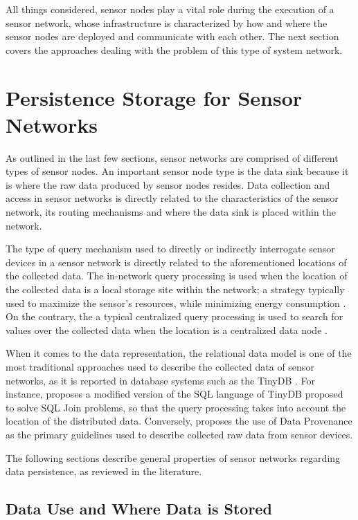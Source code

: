 All things considered, sensor nodes play a vital role during the execution
of a sensor network, whose infrastructure is characterized by how and where the
sensor nodes are deployed and communicate with each other. The next
section covers the approaches dealing with the problem of this type of system
network.

\section{Persistence Storage for Sensor Networks}

As outlined in the last few sections, sensor networks are comprised of
different types of sensor nodes. An important sensor node type is the
data sink because it is where the raw data produced by sensor
nodes resides. Data collection and access in sensor networks is directly
related to the characteristics of the sensor network, its routing mechanisms
and where the data sink is placed within the network.

The type of query mechanism used to directly or indirectly interrogate sensor
devices in a sensor network is directly related to the aforementioned locations
of the collected data. The in-network query processing is used when the
location of the collected data is a local storage site \cite{sn-storage01,
sn-storage03} within the network; a strategy typically used to maximize the
sensor's resources, while minimizing energy consumption \cite{sn-storage04}. On
the contrary, the a typical centralized query processing is used to search for
values over the collected data when the location is a centralized data
node \cite{sn-storage02}.

When it comes to the data representation, the relational data model
\cite{relational-model} is one of the most traditional approaches used to
describe the collected data of sensor networks, as it is reported in database
systems such as the TinyDB \cite{sn-db-tinydb}. For instance, \cite{sn-db-newop}
proposes a modified version of the SQL language of TinyDB proposed to solve
SQL Join problems, so that the query processing takes into account the location
of the distributed data. Conversely, \cite{sn-provenance} proposes the use of
Data Provenance as the primary guidelines used to describe collected  raw data from
sensor devices.

The following sections describe general properties of sensor networks regarding
data persistence, as reviewed in the literature.

\subsection{Data Use and Where Data is Stored}
\label{sec:sn-data-purpose}
\label{sec:sn-storage-locations}

